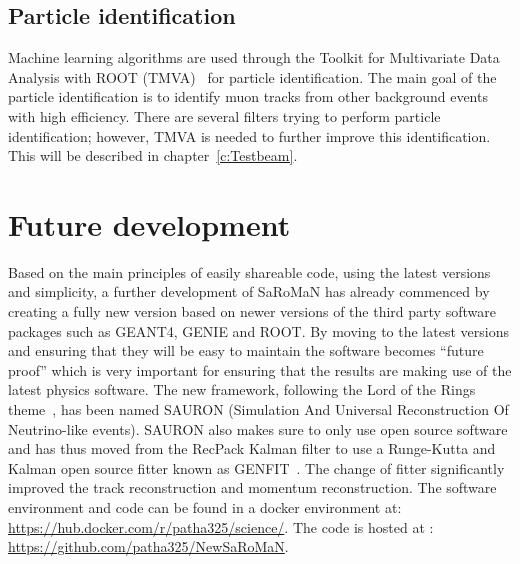 \subsection{Particle identification}
Machine learning algorithms are used through the Toolkit for Multivariate Data Analysis with ROOT (TMVA)~\cite{TMVA} for particle identification. The main goal of the particle identification is to identify muon tracks from other background events with high efficiency. There are several filters trying to perform particle identification; however, TMVA is needed to further improve this identification. This will be described in chapter~\ref{c:Testbeam}.



\section{Future development}
Based on the main principles of easily shareable code, using the latest versions and simplicity, a further development of SaRoMaN has already commenced by creating a fully new version based on newer versions of the third party software packages such as GEANT4, GENIE and ROOT. By moving to the latest versions and ensuring that they will be easy to maintain the software becomes ``future proof'' which is very important for ensuring that the results are making use of the latest physics software. The new framework, following the Lord of the Rings theme~\cite{79tolkien2012lord}, has been named SAURON (Simulation And Universal Reconstruction Of Neutrino-like events). SAURON also makes sure to only use open source software and has thus moved from the RecPack Kalman filter to use a Runge-Kutta and Kalman open source fitter known as GENFIT~\cite{81Genfit}. The change of fitter significantly improved the track reconstruction and momentum reconstruction.
The software environment and code can be found in a docker environment at: \url{https://hub.docker.com/r/patha325/science/}. The code is hosted at : \url{https://github.com/patha325/NewSaRoMaN}.

